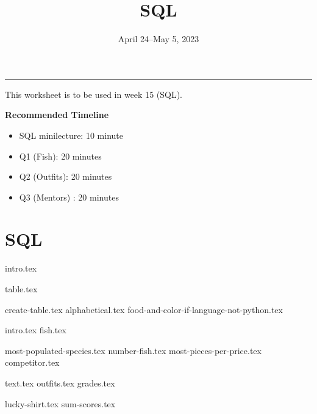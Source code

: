\documentclass{exam}
\title{SQL}
\date{April 24--May 5, 2023}
\begin{document}
\maketitle\rule{\textwidth}{0.15em}

This worksheet is to be used in week 15 (SQL).

\begin{guide}

    \textbf{Recommended Timeline}
    \begin{itemize}
        \item SQL minilecture: 10 minute
        \item Q1 (Fish): 20 minutes
        \item Q2 (Outfits): 20 minutes
        \item Q3 (Mentors) : 20 minutes
    \end{itemize}
\end{guide}


\section{SQL}
{intro.tex}
\newpage
\begin{questions}
  \question
  {table.tex}
  \begin{parts}
    {create-table.tex}
    {alphabetical.tex}
    {food-and-color-if-language-not-python.tex}
  \end{parts}
  
  \newpage
  \question 
  {intro.tex}
  {fish.tex}
  \begin{parts}
    {most-populated-species.tex}
    {number-fish.tex}
    {most-pieces-per-price.tex}
    {competitor.tex}
  \end{parts}

  \newpage
  \question
  {text.tex}
  {outfits.tex}
  {grades.tex}
  \begin{parts}
  {lucky-shirt.tex}
  {sum-scores.tex}
  \end{parts}
\end{questions}
\end{document}
